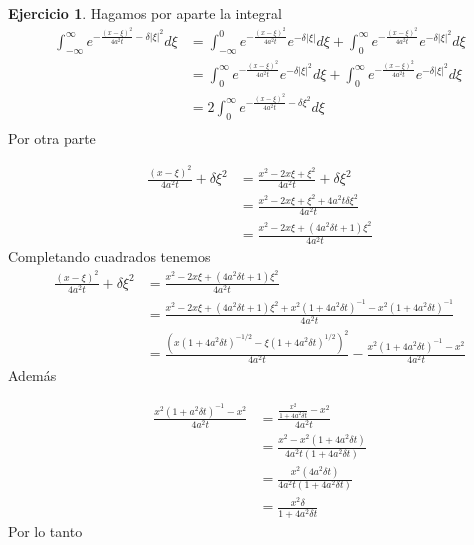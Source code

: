 \documentclass{article}
\theoremstyle{plain}
\theoremstyle{definition}
\newtheorem{ex}[proposición]{Ejercicio}
\begin{document}
\begin{ex}
Hagamos por aparte la integral
\begin{align*}
    \int_{-\infty}^{\infty} e^{-\frac{(x - \xi)^2}{4a^2 t} -\delta|\xi|^{2}} d\xi &= \int_{-\infty}^{0} e^{-\frac{(x - \xi)^2}{4a^2 t}} e^{-\delta|\xi|} d\xi + \int_{0}^{\infty} e^{-\frac{(x - \xi)^2}{4a^2 t}} e^{-\delta|\xi|^{2}} d\xi \\
    &= \int_{0}^{\infty} e^{-\frac{(x - \xi)^2}{4a^2 t}} e^{-\delta|\xi|^{2}} d\xi + \int_{0}^{\infty} e^{-\frac{(x - \xi)^2}{4a^2 t}} e^{-\delta|\xi|^{2}} d\xi \\
    &= 2 \int_{0}^{\infty} e^{-\frac{(x - \xi)^2}{4a^2 t}-\delta\xi^{2}} d\xi \\
\end{align*}
 Por otra parte

\begin{align*}
    \frac{(x - \xi)^2}{4a^2 t} + \delta\xi^{2} &= \frac{x^2 - 2x\xi + \xi^2}{4a^2 t} + \delta\xi^{2} \\
    &= \frac{x^2 - 2x\xi + \xi^2 + 4a^2 t \delta \xi^2}{4a^2 t} \\
    &= \frac{x^2 - 2x\xi + (4a^2\delta  t + 1)\xi^2}{4a^2 t}
\end{align*}
Completando cuadrados tenemos
\begin{align*}
    \frac{(x - \xi)^2}{4a^2 t} + \delta\xi^{2} &= \frac{x^2 - 2x\xi + (4a^2\delta  t + 1)\xi^2}{4a^2 t}\\
    &= \frac{x^2 - 2x\xi + (4a^2\delta  t + 1)\xi^2 +x^2(1+4a^2\delta  t)^{-1} - x^2(1+4a^2\delta  t)^{-1}}{4a^2 t}\\
    &= \frac{(x(1 + 4a^2 \delta  t)^{-1/2} - \xi(1+4a^2\delta  t)^{1/2})^{2}}{4a^2t} - \frac{x^2(1+4a^2\delta  t)^{-1} - x^{2}}{4a^{2}t}
\end{align*}
Además

\begin{align*}
    \frac{x^2(1+a^2\delta  t)^{-1} - x^{2}}{4a^{2}t} &= \frac{\frac{x^2}{1+4a^2\delta  t} - x^{2}}{4a^{2}t} \\
    &= \frac{x^2 - x^{2}(1+4a^2\delta  t)}{4a^{2}t(1+4a^2\delta  t)} \\
    &= \frac{x^2(4a^2\delta  t)}{4a^{2}t(1+4a^2\delta  t)} \\
    &= \frac{x^2\delta}{1+4a^2\delta  t}
\end{align*}
Por lo tanto


\end{ex}
\end{document}
